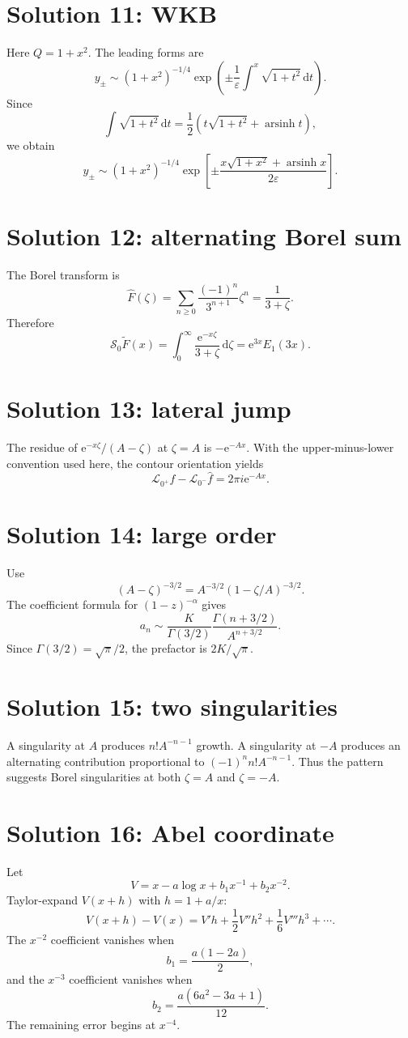 \documentclass[11pt,oneside,openany]{book}
\newcommand{\e}{\mathrm{e}}
\newcommand{\dd}{\,\mathrm{d}}
\newcommand{\eps}{\varepsilon}
\theoremstyle{plain}
\theoremstyle{definition}
\theoremstyle{remark}
\begin{document}
\section*{Solution 11: WKB}
Here $Q=1+x^2$. The leading forms are
\[
  y_\pm\sim(1+x^2)^{-1/4}
  \exp\left(\pm\frac1\eps\int^x\sqrt{1+t^2}\dd t\right).
\]
Since
\[
  \int\sqrt{1+t^2}\dd t
  =\frac12\left(t\sqrt{1+t^2}+\operatorname{arsinh}t\right),
\]
we obtain
\[
\boxed{
 y_\pm\sim(1+x^2)^{-1/4}
 \exp\left[\pm\frac{x\sqrt{1+x^2}+\operatorname{arsinh}x}{2\eps}\right].}
\]

\section*{Solution 12: alternating Borel sum}
The Borel transform is
\[
  \widehat F(\zeta)=\sum_{n\ge0}\frac{(-1)^n}{3^{n+1}}\zeta^n
  =\frac1{3+\zeta}.
\]
Therefore
\[
\boxed{
  \mathcal S_0\widetilde F(x)
  =\int_0^\infty\frac{\e^{-x\zeta}}{3+\zeta}\dd\zeta
  =\e^{3x}E_1(3x).}
\]

\section*{Solution 13: lateral jump}
The residue of $\e^{-x\zeta}/(A-\zeta)$ at $\zeta=A$ is $-\e^{-Ax}$. With the upper-minus-lower convention used here, the contour orientation yields
\[
\boxed{
  \mathcal L_{0^+}\widehat f-
  \mathcal L_{0^-}\widehat f=2\pi i\e^{-Ax}.}
\]

\section*{Solution 14: large order}
Use
\[
  (A-\zeta)^{-3/2}=A^{-3/2}
  (1-\zeta/A)^{-3/2}.
\]
The coefficient formula for $(1-z)^{-\alpha}$ gives
\[
\boxed{
  a_n\sim\frac{K}{\Gamma(3/2)}
  \frac{\Gamma(n+3/2)}{A^{n+3/2}}.}
\]
Since $\Gamma(3/2)=\sqrt\pi/2$, the prefactor is $2K/\sqrt\pi$.

\section*{Solution 15: two singularities}
A singularity at $A$ produces $n!A^{-n-1}$ growth. A singularity at $-A$ produces an alternating contribution proportional to $(-1)^nn!A^{-n-1}$. Thus the pattern suggests Borel singularities at both $\zeta=A$ and $\zeta=-A$.

\section*{Solution 16: Abel coordinate}
Let
\[
  V=x-a\log x+b_1x^{-1}+b_2x^{-2}.
\]
Taylor-expand $V(x+h)$ with $h=1+a/x$:
\[
  V(x+h)-V(x)=V'h+\frac12V''h^2+\frac16V'''h^3+\cdots.
\]
The $x^{-2}$ coefficient vanishes when
\[
  b_1=\frac{a(1-2a)}2,
\]
and the $x^{-3}$ coefficient vanishes when
\[
  b_2=\frac{a(6a^2-3a+1)}{12}.
\]
The remaining error begins at $x^{-4}$.
\end{document}
